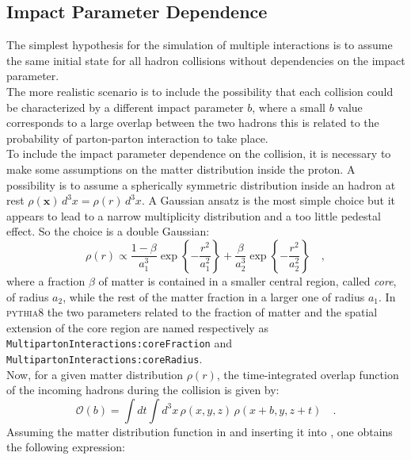 \subsection{Impact Parameter Dependence}

The simplest hypothesis for the simulation of multiple interactions is to assume the same initial state for all hadron collisions without dependencies on the impact parameter. 
\\
The more realistic scenario is to include the possibility that each collision could be characterized by a different impact parameter $b$, where a small $b$ value corresponds to a large overlap between the two hadrons this is related to the probability of parton-parton interaction to take place.
\\
To include the impact parameter dependence on the collision, it is necessary to make some assumptions on the matter distribution inside the proton. A possibility is to assume a spherically symmetric distribution inside an hadron at rest $\rho(\mathbf{x})\,d^3x=\rho(r)\,d^3x$. A Gaussian ansatz is the most simple choice but it appears to lead to a narrow multiplicity distribution and a too little pedestal effect. So the choice is a double Gaussian:
\begin{equation}
	\rho(r) \propto \frac{1-\beta}{a_1^3}\exp\left\{-\frac{r^2}{a_1^2}\right\}+\frac{\beta}{a_2^3}\exp\left\{ -\frac{r^2}{a_2^2} \right\}\quad,
	\label{eq:matterDistribution}
\end{equation}
where a fraction $\beta$ of matter is contained in a smaller central region, called \textit{core}, of radius $a_2$, while the rest of the matter fraction in a larger one of radius $a_1$. In \textsc{pythia8} the two parameters related to the fraction of matter and the spatial extension of the core region are named respectively as \texttt{Multiparton}\-\texttt{Interactions:}\-\texttt{core}\-\texttt{Fraction} and \texttt{Multiparton}\-\texttt{Interactions:}\-\texttt{core}\-\texttt{Radius}.
\\
Now, for a given matter distribution $\rho(r)$,  the time-integrated overlap function of the incoming hadrons during the collision is given by:
\begin{equation}
	\mathcal{O}(b)=\displaystyle\int dt \displaystyle\int d^3x\,\rho(x,y,z)\,\rho(x+b,y,z+t)\quad.
	\label{eq:overlappingFunction}
\end{equation} 
Assuming the matter distribution function in  and inserting it into , one obtains the following expression:
